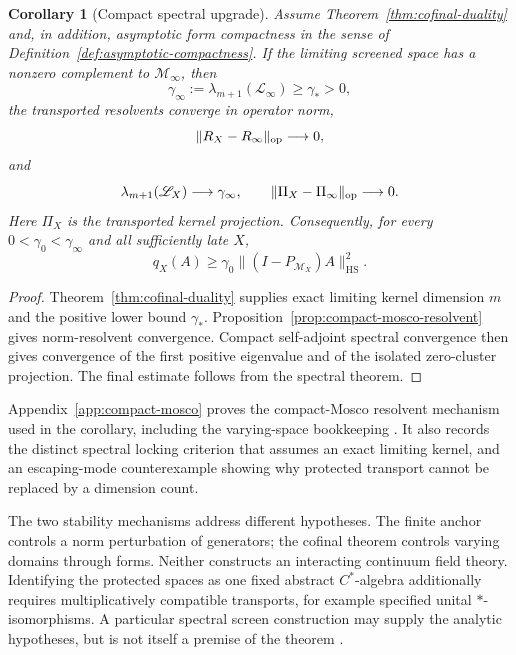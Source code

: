 \documentclass[11pt]{article}
\numberwithin{equation}{section}
\newtheorem{corollary}[theorem]{Corollary}
\theoremstyle{definition}
\theoremstyle{remark}
\newcommand{\HS}{\mathrm{HS}}
\newcommand{\norm}[1]{\lVert#1\rVert}
\newcommand{\M}{\mathcal M}
\begin{document}
\begin{corollary}[Compact spectral upgrade]
\label{cor:cofinal-spectral-upgrade}
Assume Theorem~\ref{thm:cofinal-duality} and, in addition, asymptotic form
compactness in the sense of Definition~\ref{def:asymptotic-compactness}.  If
the limiting screened space has a nonzero complement to $\M_\infty$, then
\begin{equation}
 \gamma_\infty:=\lambda_{m+1}(\mathscr L_\infty)\ge\gamma_*>0,
 \label{eq:limit-gap}
\end{equation}
the transported resolvents converge in operator norm,
\begin{equation}
 \norm{R_X-R_\infty}_{\rm op}\longrightarrow0,
 \label{eq:cofinal-norm-resolvent}
\end{equation}
and
\begin{equation}
 \lambda_{m+1}(\mathscr L_X)\longrightarrow\gamma_\infty,\qquad
 \norm{\Pi_X-\Pi_\infty}_{\rm op}\longrightarrow0.
 \label{eq:cofinal-spectral-upgrade}
\end{equation}
Here $\Pi_X$ is the transported kernel projection.  Consequently, for every
$0<\gamma_0<\gamma_\infty$ and all sufficiently late $X$,
\begin{equation}
 q_X(A)\ge\gamma_0\norm{(I-P_{\M_X})A}_{\HS}^2.
 \label{eq:cofinal-coercivity}
\end{equation}
\end{corollary}

\begin{proof}
Theorem~\ref{thm:cofinal-duality} supplies exact limiting kernel dimension $m$
and the positive lower bound $\gamma_*$.  Proposition~\ref{prop:compact-mosco-resolvent}
gives norm-resolvent convergence.  Compact self-adjoint spectral convergence
then gives convergence of the first positive eigenvalue and of the isolated
zero-cluster projection.  The final estimate follows from the spectral theorem.
\end{proof}

Appendix~\ref{app:compact-mosco} proves the compact-Mosco resolvent mechanism
used in the corollary, including the varying-space bookkeeping
\cite{KuwaeShioya2003}.  It also records the distinct spectral locking
criterion that assumes an exact limiting kernel, and an escaping-mode
counterexample showing why protected transport cannot be replaced by a
dimension count.

The two stability mechanisms address different hypotheses.  The finite
anchor controls a norm perturbation of generators; the cofinal theorem
controls varying domains through forms.  Neither constructs an interacting
continuum field theory.  Identifying the protected spaces as one fixed
abstract $C^*$-algebra additionally requires multiplicatively compatible
transports, for example specified unital $*$-isomorphisms.  A particular
spectral screen construction may supply the analytic hypotheses, but is not
itself a premise of the theorem \cite{PelissierSpectral2026}.
\end{document}
